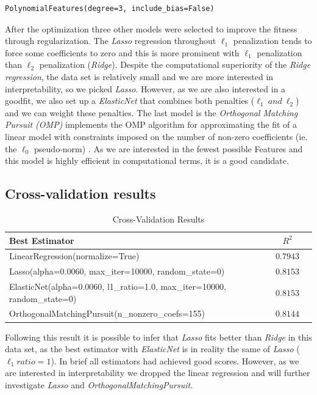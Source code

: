 \documentclass[11pt, a4]{article}
\begin{document}
\begin{lstlisting}
PolynomialFeatures(degree=3, include_bias=False)
\end{lstlisting}

After the optimization three other models were selected to improve the fitness through regularization. The \textit{Lasso} regression throughout $\ell_1$ penalization tends to force some coefficients to zero and this is more prominent with $\ell_1$ penalization than $\ell_2$ penalization (\textit{Ridge}). Despite the computational superiority of the \textit{Ridge regression}, the data set is relatively small and we are more interested in interpretability, so we picked \textit{Lasso}. However, as we are also interested in a goodfit, we also set up a \textit{ElasticNet} that combines both penalties ($\ell_1\: and\: \ell_2$) and we can weight these penalties. The last model is the \textit{Orthogonal Matching Pursuit (OMP)} implements the OMP algorithm for approximating the fit of a linear model with constraints imposed on the number of non-zero coefficients (ie. the $\ell_0$ pseudo-norm) \cite{OMP}. As we are interested in the fewest possible Features and this model is highly efficient in computational terms, it is a good candidate.

\subsection{Cross-validation results}

 \begin{table}[h!]
\centering
\begin{tabular}{l c c}
\toprule
\textbf{Best Estimator} & \textbf{$R^2$} \\
\midrule
LinearRegression(normalize=True) & $0.7943$\\
Lasso(alpha=0.0060, max\_iter=10000, random\_state=0) & $0.8153$\\
ElasticNet(alpha=0.0060, l1\_ratio=1.0, max\_iter=10000,
            random\_state=0) & $0.8153$\\ 
OrthogonalMatchingPursuit(n\_nonzero\_coefs=155) & $0.8144$\\
\bottomrule
\end{tabular}
\caption{Cross-Validation Results}
\label{table:3}
\end{table}

Following this result it is possible to infer that \textit{Lasso} fits better than \textit{Ridge} in this data set, as the best estimator with \textit{ElasticNet} is in reality the same of \textit{Lasso} ($\ell_1ratio=1$). In brief all estimators had achieved good scores. However, as we are interested in interpretability we dropped the linear regression and will further investigate \textit{Lasso} and \textit{OrthogonalMatchingPursuit}.
\end{document}
